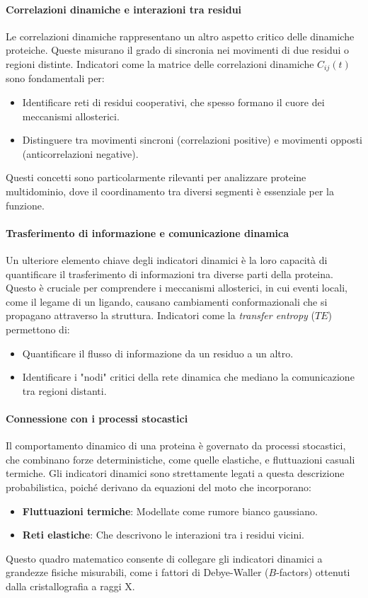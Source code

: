 \documentclass[Lau,binding=0.6cm,oneside,noexaminfo]{sapthesis}
\begin{document}
\paragraph{Correlazioni dinamiche e interazioni tra residui}
Le correlazioni dinamiche rappresentano un altro aspetto critico delle dinamiche proteiche. Queste misurano il grado di sincronia nei movimenti di due residui o regioni distinte. Indicatori come la matrice delle correlazioni dinamiche $C_{ij}(t)$ sono fondamentali per:
\begin{itemize}
    \item Identificare reti di residui cooperativi, che spesso formano il cuore dei meccanismi allosterici.
    \item Distinguere tra movimenti sincroni (correlazioni positive) e movimenti opposti (anticorrelazioni negative).
\end{itemize}
Questi concetti sono particolarmente rilevanti per analizzare proteine multidominio, dove il coordinamento tra diversi segmenti è essenziale per la funzione.

\paragraph{Trasferimento di informazione e comunicazione dinamica}
Un ulteriore elemento chiave degli indicatori dinamici è la loro capacità di quantificare il trasferimento di informazioni tra diverse parti della proteina. Questo è cruciale per comprendere i meccanismi allosterici, in cui eventi locali, come il legame di un ligando, causano cambiamenti conformazionali che si propagano attraverso la struttura. Indicatori come la \textit{transfer entropy} ($TE$) permettono di:
\begin{itemize}
    \item Quantificare il flusso di informazione da un residuo a un altro.
    \item Identificare i "nodi" critici della rete dinamica che mediano la comunicazione tra regioni distanti.
\end{itemize}

\paragraph{Connessione con i processi stocastici}
Il comportamento dinamico di una proteina è governato da processi stocastici, che combinano forze deterministiche, come quelle elastiche, e fluttuazioni casuali termiche. Gli indicatori dinamici sono strettamente legati a questa descrizione probabilistica, poiché derivano da equazioni del moto che incorporano:
\begin{itemize}
    \item \textbf{Fluttuazioni termiche}: Modellate come rumore bianco gaussiano.
    \item \textbf{Reti elastiche}: Che descrivono le interazioni tra i residui vicini.
\end{itemize}
Questo quadro matematico consente di collegare gli indicatori dinamici a grandezze fisiche misurabili, come i fattori di Debye-Waller ($B$-factors) ottenuti dalla cristallografia a raggi X.
\end{document}
